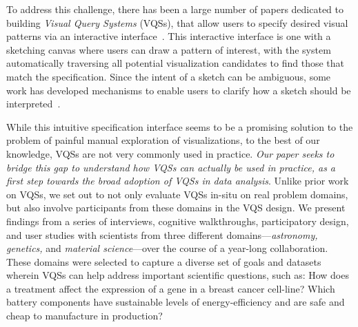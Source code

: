 \par To address this challenge, 
there has been a large number of papers 
dedicated to building {\em Visual Query Systems} (VQSs), 
that allow users to specify 
desired visual patterns 
via an interactive interface~\cite{mohebbi2011google,Hochheiser2004,wattenberg2001sketching,Siddiqui2017VLDB,ryall2005querylines,correll2016semantics,Mannino2018,Eichmann2015,Holz2009}. 
This interactive interface is one with 
a sketching canvas
where users can draw a pattern of interest,
with the system automatically traversing 
all potential visualization candidates 
to find those that match the specification. 
Since the intent of a sketch can be ambiguous, 
some work has developed mechanisms to
enable users to clarify 
how a sketch should be interpreted~\cite{ryall2005querylines,correll2016semantics,Mannino2018,Eichmann2015,Holz2009}. 

\par 
While this intuitive 
specification interface 
seems to be a promising solution 
to the problem of painful manual exploration of visualizations, 
to the best of our knowledge, VQSs are not very commonly used in practice. 
{\em Our paper seeks to bridge this gap 
to understand how VQSs can actually be used in practice, 
as a first step towards the broad adoption of VQSs in data analysis}.
Unlike prior work on VQSs,
we set out to not only evaluate VQSs in-situ on
real problem domains, but also involve participants
from these domains in the VQS design. 
We present findings from a series of interviews, 
cognitive walkthroughs, participatory design, 
and user studies with scientists from three different domains---{\em astronomy, genetics,} and {\em material science}---over the course of 
a year-long collaboration. 
These domains were selected to capture 
a diverse set of goals 
and datasets wherein VQSs can help address 
important scientific questions, such as: 
How does a treatment affect the expression 
of a gene in a breast cancer cell-line? 
Which battery components have sustainable 
levels of energy-efficiency and are safe and 
cheap to manufacture in production?

